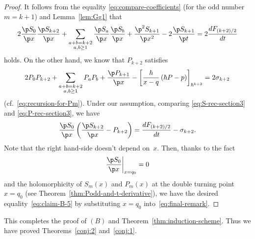 \begin{proof}
It follows from
the equality \eqref{eq:compare-coefficients}
(for the odd number $m = k+1$) and Lemma~\ref{lem:Gg1} that
\begin{gather} \label{eq:S-rec-section3}
2 \frac{\p S_{0}}{\p x}\frac{\p S_{k+2}}{\p x} +
\sum_{\substack{a+b=k+2 \\ a, b \ge 1}}
\frac{\p S_{a}}{\p x}\frac{\p S_{b}}{\p x} +
\frac{\p^{2} S_{k+1}}{\p x^{2}}
- 2\frac{\p S_{k+1}}{\p t}
 = 2 \frac{d F_{(k+2)/2}}{dt}
\end{gather}
holds.
On the other hand, we know that $P_{k+2}$ satisf\/ies
\begin{gather} \label{eq:P-rec-section3}
2 P_{0}P_{k+2} +
\sum_{\substack{a+b=k+2 \\ a, b \ge 1}}
P_{a}P_{b} +
\frac{\p P_{k+1}}{\p x} - \left[ \frac{\hbar}{x-q}
\left( \hbar P-p \right) \right]_{\hbar^{k+2}}
 = 2 \sigma_{k+2}
\end{gather}
(cf.~\eqref{eq:recursion-for-Pm}).
Under our assumption, comparing \eqref{eq:S-rec-section3}
and \eqref{eq:P-rec-section3}, we have
\begin{gather} \label{eq:final-remark}
\frac{\p S_{0}}{\p x} \left( \frac{\p S_{k+2}}{\p x} - P_{k+2} \right)
 = \frac{d F_{(k+2)/2}}{dt} - \sigma_{k+2}.
\end{gather}
Note that the right hand-side doesn't depend on~$x$.
Then, thanks to the fact
\begin{gather*}
\frac{\p S_{0}}{\p x} \biggr|_{x=q_{0}}
= 0
\end{gather*}
and the holomorphicity of $S_{m}(x)$ and $P_{m}(x)$
at the double turning point $x = q_0$
(see Theorem~\ref{thm:Podd-and-t-derivative}),
we have the desired equality~\eqref{eq:claim-B-5}
by substituting $x = q_{0}$ into~\eqref{eq:final-remark}.
\end{proof}

This completes the proof of $(B)$ and Theorem~\ref{thm:induction-scheme}.
Thus we have proved Theorems~\ref{conj:2} and~\ref{conj:1}.
